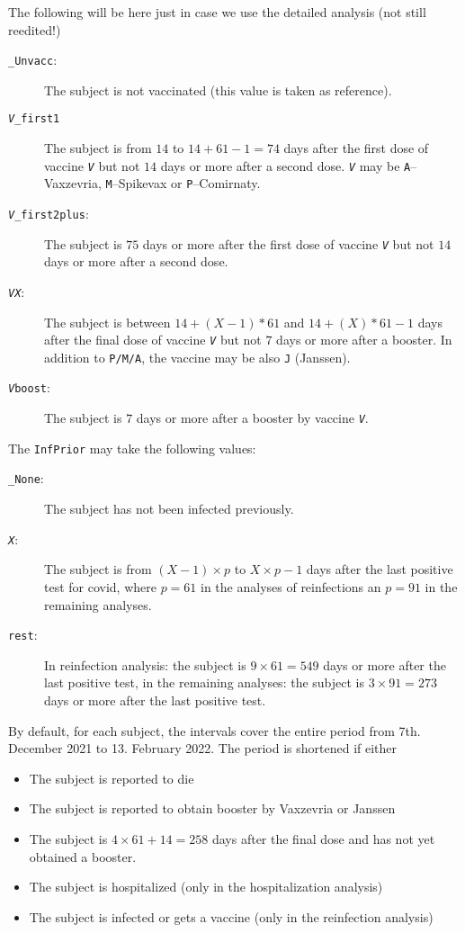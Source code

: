 \documentclass[preprint,12pt,authoryear]{elsarticle}
\begin{document}
{\color{blue} The following will be here just in case we use the detailed analysis (not still reedited!)
\begin{description}
\item[{\tt \_Unvacc}:] The subject is not vaccinated (this value is taken as reference).
\item[{\tt \emph{V}\_first1}] The subject is from $14$ to $14+61-1=74$ days after the first dose of vaccine {\tt \emph{V}} but not $14$ days or more after a second dose. {\tt \emph{V}} may be {\tt A}--Vaxzevria, {\tt M}--Spikevax or {\tt P}--Comirnaty.
\item[{\tt \emph{V}\_first2plus}:] The subject is $75$ days or more after the first dose of vaccine {\tt \emph{V}} but not $14$ days or more after a second dose.
\item[{\tt \emph{VX}}:] The subject is between $14+(X-1)*61$ and $14+(X)*61-1$ days after the final dose of vaccine {\tt \emph{V}} but not $7$ days or more after a booster. In addition to {\tt P/M/A}, the vaccine may be also {\tt J} (Janssen).
\item[{\tt \emph{V}boost}:] The subject is $7$ days or more after a booster by vaccine {\tt \emph{V}}.
\end{description}
The {\tt InfPrior} may take the following values:
\begin{description}
\item[{\tt \_None}:] The subject has not been infected previously.
\item[{\tt \emph{X}}:] The subject is from $(X-1)\times p$ to $X\times p - 1$ days after the last positive test for covid, where $p=61$ in the analyses of reinfections an $p=91$ in the remaining analyses.
\item[{\tt rest}:] In reinfection analysis: the subject is $9 \times 61 = 549$ days or more after the last positive test, in the remaining analyses: the subject is $3 \times 91 = 273$ days or more after the last positive test. 
\end{description}
}
By default, for each subject, the intervals cover the entire period from 7th. December 2021 to 13. February 2022. The period is shortened if either
\begin{itemize} 
\item The subject is reported to die
\item The subject is reported to obtain booster by Vaxzevria or Janssen
\item The subject is $4 \times 61 + 14 = 258$ days after the final dose and has not yet obtained a booster.
\item The subject is hospitalized (only in the hospitalization analysis)
\item The subject is infected or gets a vaccine (only in the reinfection analysis)
\end{itemize}
\end{document}
